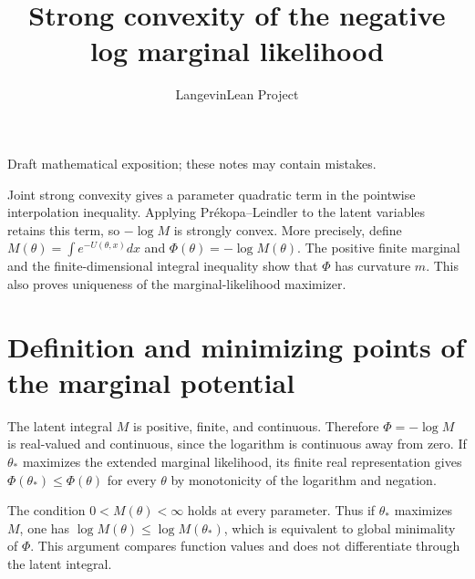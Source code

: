 \documentclass[11pt,a4paper]{article}
\title{\texorpdfstring{Strong convexity of the negative log marginal likelihood}{Strong convexity of the negative log marginal likelihood}}
\author{LangevinLean Project}
\date{}
\begin{document}
\maketitle
Draft mathematical exposition; these notes may contain mistakes.


Joint strong convexity gives a parameter quadratic term in the pointwise interpolation inequality. Applying Prékopa–Leindler to the latent variables retains this term, so \(-\log M\) is strongly convex. More precisely, define \(M(\theta)=\int e^{-U(\theta,x)}dx\) and \(\Phi(\theta)=-\log M(\theta)\). The positive finite marginal and the finite-dimensional integral inequality show that \(\Phi\) has curvature \(m\). This also proves uniqueness of the marginal-likelihood maximizer.


\section{\texorpdfstring{Definition and minimizing points of the marginal potential}{Definition and minimizing points of the marginal potential}}


The latent integral \(M\) is positive, finite, and continuous. Therefore \(\Phi=-\log M\) is real-valued and continuous, since the logarithm is continuous away from zero. If \(\theta_*\) maximizes the extended marginal likelihood, its finite real representation gives \(\Phi(\theta_*)\le\Phi(\theta)\) for every \(\theta\) by monotonicity of the logarithm and negation.



The condition \(0<M(\theta)<\infty\) holds at every parameter. Thus if \(\theta_*\) maximizes \(M\), one has \(\log M(\theta)\le\log M(\theta_*)\), which is equivalent to global minimality of \(\Phi\). This argument compares function values and does not differentiate through the latent integral.
\end{document}
